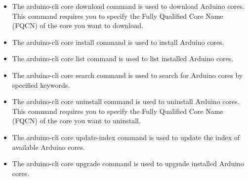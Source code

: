 \begin{itemize}
    
    \item {}
    
    The arduino-cli core download command is used to download Arduino cores. This command requires you to specify the Fully Qualified Core Name (FQCN) of the core you want to download.
    
    
    \item {}
    
    The arduino-cli core install command is used to install Arduino cores. 
    
    
    \item {}
    
    The arduino-cli core list command is used to list installed Arduino cores.
    
    
    \item {}
    
    The arduino-cli core search command is used to search for Arduino cores by specified keywords.
    
    
    \item {}
    
    The arduino-cli core uninstall command is used to uninstall Arduino cores. This command requires you to specify the Fully Qualified Core Name (FQCN) of the core you want to uninstall.
    
    
    \item {}
    
    The arduino-cli core update-index command is used to update the index of available Arduino cores.
    
    
    \item {}
    
    The arduino-cli core upgrade command is used to upgrade installed Arduino cores.
    

\end{itemize}
